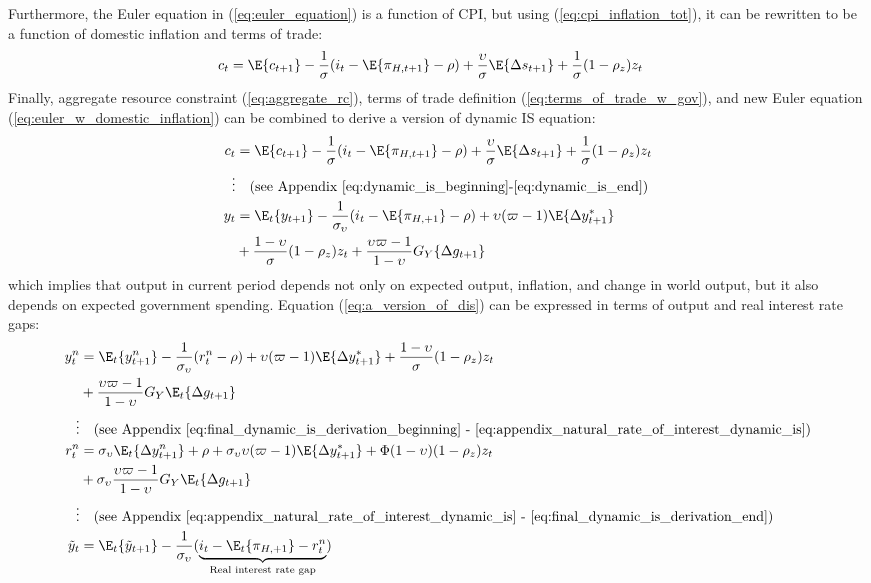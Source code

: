 Furthermore, the Euler equation in (\ref{eq:euler_equation}) is a function of CPI, but using (\ref{eq:cpi_inflation_tot}), it can be rewritten to be a function of domestic inflation and terms of trade:
\begin{align}
    c_t &= \E\{ c_{t+1}\} - \frac{1}{\sigma}(i_t - \E \{ \pi_{H,t+1}\} - \rho) + \frac{\upsilon}{\sigma}\E \{ \Delta s_{t+1} \} + \frac{1}{\sigma}(1-\rho_z)z_t \label{eq:euler_w_domestic_inflation}
\end{align}
Finally, aggregate resource constraint (\ref{eq:aggregate_rc}), terms of trade definition (\ref{eq:terms_of_trade_w_gov}), and new Euler equation (\ref{eq:euler_w_domestic_inflation}) can be combined to derive a version of dynamic IS equation:
\begin{align}
    c_t &= \E\{ c_{t+1}\} - \frac{1}{\sigma}(i_t - \E \{ \pi_{H,t+1}\} - \rho) + \frac{\upsilon}{\sigma}\E \{ \Delta s_{t+1} \} + \frac{1}{\sigma}(1-\rho_z)z_t \\
    \vdots & \quad \text{(see Appendix \ref{eq:dynamic_is_beginning}-\ref{eq:dynamic_is_end})} \nonumber \\
    y_t  &= \E_t \{y_{t+1}\} - \frac{1}{\sigma_\upsilon}(i_t - \E \{ \pi_{H,+1}\} - \rho) + \upsilon (\varpi - 1)\E \{\Delta y_{t+1}^* \} \nonumber \\ 
    &+ \frac{1-\upsilon}{\sigma} (1-\rho_z)z_t + \frac{\upsilon \varpi  - 1}{1-\upsilon} G_Y \{\Delta g_{t+1}\} \label{eq:a_version_of_dis}
\end{align}
which implies that output in current period depends not only on expected output, inflation, and change in world output, but it also depends on expected government spending. Equation (\ref{eq:a_version_of_dis}) can be expressed in terms of output and real interest rate gaps:
\begin{align}
    y^n_t  &= \E_t\{y^n_{t+1}\} - \frac{1}{\sigma_\upsilon}(r^n_t - \rho) + \upsilon (\varpi - 1)\E \{\Delta y_{t+1}^* \}  + \frac{1-\upsilon}{\sigma} (1-\rho_z)z_t \nonumber \\ 
    &+ \frac{\upsilon \varpi  - 1}{1-\upsilon} G_Y \E_t \{ \Delta g_{t+1} \}\nonumber \\
    \vdots & \quad \text{(see Appendix \ref{eq:final_dynamic_is_derivation_beginning} - \ref{eq:appendix_natural_rate_of_interest_dynamic_is})} \nonumber \\
    r^n_t  &= \sigma_\upsilon \E_t \{\Delta y^n_{t+1}\} + \rho + \sigma_\upsilon \upsilon (\varpi - 1)\E \{\Delta y_{t+1}^* \}  + \Phi (1-\upsilon)(1-\rho_z)z_t \nonumber \\ 
    &+ \sigma_\upsilon \frac{\upsilon \varpi  - 1}{1-\upsilon} G_Y \E_t \{ \Delta g_{t+1} \} \label{eq:natural_rate_of_interest_dynamic_is}\\
    \vdots & \quad \text{(see Appendix \ref{eq:appendix_natural_rate_of_interest_dynamic_is} - \ref{eq:final_dynamic_is_derivation_end})} \nonumber \\
    \tilde{y}_t &= \E_t \{\tilde{y}_{t+1}\} - \frac{1}{\sigma_\upsilon}(\underbrace{i_t - \E_t \{ \pi_{H,+1}\} - r^n_t}_{\text{Real interest rate gap}}) \label{eq:dynamic_is}
\end{align}
